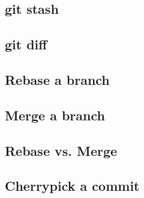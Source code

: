 \subsection{git stash}
\begin{frame}[fragile]
    \subslidetitle
\end{frame}

\subsection{git diff}
\begin{frame}[fragile]
    \subslidetitle
\end{frame}

\subsection{Rebase a branch}
\begin{frame}[fragile]
    \subslidetitle
\end{frame}

\subsection{Merge a branch}
\begin{frame}[fragile]
    \subslidetitle
\end{frame}

\subsection{Rebase vs. Merge}
\begin{frame}[fragile]
    \subslidetitle
\end{frame}

\subsection{Cherrypick a commit}
\begin{frame}[fragile]
    \subslidetitle
\end{frame}

